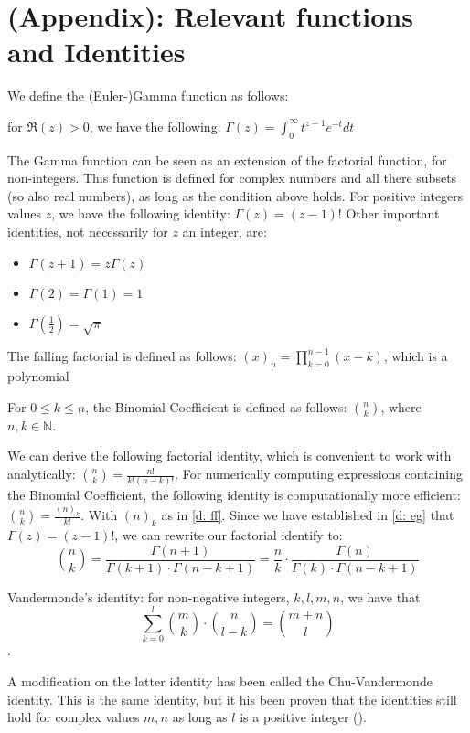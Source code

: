 \section{(Appendix): Relevant functions and Identities}\label{s:appendices}
We define the (Euler-)Gamma function as follows:
\begin{definition}\label{d: eg}
    for \(\Re(z) > 0\), we have the following: \(\Gamma(z) = \int_{0}^{\infty} t^{z-1} e^{-t} dt\)
\end{definition}

The Gamma function can be seen as an extension of the factorial function, for non-integers. This function is defined for complex numbers and all there subsets (so also real numbers), as long as the condition above holds. For positive integers values \(z\), we have the following identity: \(\Gamma(z) = (z - 1)!\)
Other important identities, not necessarily for \(z\) an integer, are: 
\begin{itemize}
    \item \(\Gamma(z + 1) = z \Gamma(z)\)
    \item \(\Gamma(2) = \Gamma(1) = 1\)
    \item \(\Gamma(\frac{1}{2}) = \sqrt{\pi}\)
\end{itemize}

\begin{definition}\label{d: ff}
    The falling factorial is defined as follows: \((x)_n = \prod_{k = 0}^{n - 1} (x - k)\), which is a polynomial
\end{definition}
\begin{definition}
    For \(0 \leq k \leq n\), the Binomial Coefficient is defined as follows: \(\binom{n}{k}\), where \(n, k \in \mathbb{N}\).
\end{definition}
We can derive the following factorial identity, which is convenient to work with analytically: \(\binom{n}{k} = \frac{n!}{k! (n - k)!}\).
For numerically computing expressions containing the Binomial Coefficient, the following identity is computationally more efficient: \(\binom{n}{k} = \frac{(n)_k}{k!}\). With \((n)_k\) as in \ref{d: ff}.
Since we have established in \ref{d: eg} that \(\Gamma(z) = (z - 1)!\), we can rewrite our factorial identify to:
\[\binom{n}{k} = \frac{\Gamma(n + 1)}{\Gamma(k + 1) \cdot \Gamma( n - k  + 1)} = \frac{n}{k} \cdot\frac{\Gamma(n)}{\Gamma(k) \cdot \Gamma(n - k + 1)}\]

\begin{definition}
    Vandermonde's identity: for non-negative integers, \(k, l, m, n\), we have that \[\sum_{k = 0}^{l} \binom{m}{k} \cdot \binom{n}{l - k} = \binom{m + n}{l}\].
\end{definition}
A modification on the latter identity has been called the Chu-Vandermonde identity. This is the same identity, but it his been proven that the identities still hold for complex values \(m, n\) as long as \(l\) is a positive integer (\cite{askey75}).

